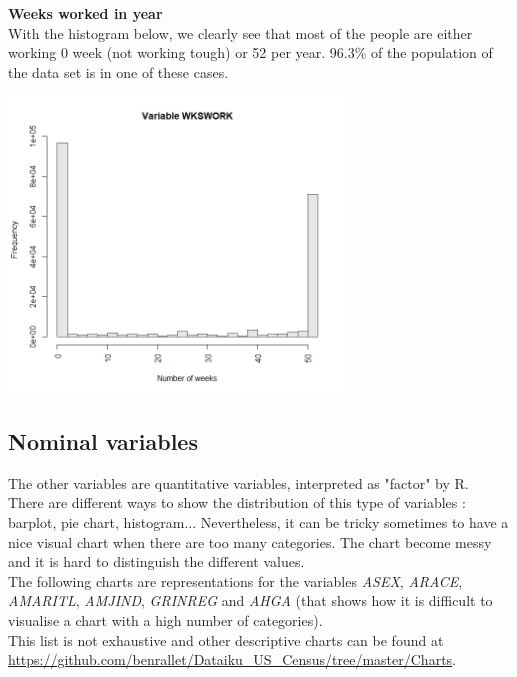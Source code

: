 \documentclass{article}
\begin{document}
\noindent\textbf{Weeks worked in year}\\

\noindent With the histogram below, we clearly see that most of the people are either working 0 week (not working tough) or 52 per year. 96.3\% of the population of the data set is in one of these cases.\\
\begin{center}
\includegraphics[width = 9cm]{WKSWORK.png}
\end{center}

\newpage

\subsection{Nominal variables}
\noindent The other variables are quantitative variables, interpreted as "factor" by R. \\
There are different ways to show the distribution of this type of variables : barplot, pie chart, histogram...
Nevertheless, it can be tricky sometimes to have a nice visual chart when there are too many categories. The chart become messy and it is hard to distinguish
the different values.\\

\noindent The following charts are representations for the variables \textit{ASEX}, \textit{ARACE}, \textit{AMARITL}, \textit{AMJIND}, \textit{GRINREG} and \textit{AHGA} (that shows how it is
difficult to visualise a chart with a high number of categories).\\

\noindent This list is not exhaustive and other descriptive charts can be found at \url{https://github.com/benrallet/Dataiku_US_Census/tree/master/Charts}. \\
\end{document}
